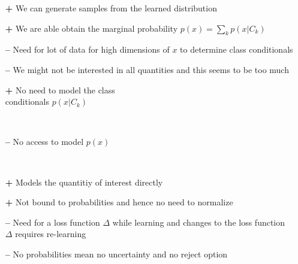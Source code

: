\begin{minipage}{1\textwidth}
	\begin{minipage}[t]{.32\textwidth}
		\vspace*{5pt}
%
		\begin{itemize}
			\item[\color{Green}\textbf{+}] We can generate samples from the learned distribution
			\item[\color{Green}\textbf{+}] We are able obtain the marginal probability $p(x) = \sum_k p(x|C_k)$
			\item[\color{Red}\textbf{--}] Need for lot of data for high dimensions of $x$ to determine class conditionals
			\item[\color{Red}\textbf{--}] We might not be interested in all quantities and this seems to be too much
		\end{itemize}
		\vspace*{5pt}
%
	\end{minipage}
	\hfill\vrule\hfill
	\begin{minipage}[t]{.32\textwidth}
		\vspace*{5pt}
		\begin{itemize}
			\item[\color{Green}\textbf{+}] No need to model the class\\conditionals $p(x|C_k)$
			\item[]~\\
			\item[\color{Red}\textbf{--}] No access to model $p(x)$
			\item[]~\\
		\end{itemize}
		\vspace*{5pt}
	\end{minipage}
	\hfill\vrule\hfill
	\begin{minipage}[t]{.32\textwidth}
		\vspace*{5pt}
		\begin{itemize}
			\item[\color{Green}\textbf{+}] Models the quantitiy of interest directly
			\item[\color{Green}\textbf{+}] Not bound to probabilities and hence no need to normalize
			\item[\color{Red}\textbf{--}] Need for a loss function $\Delta$ while learning and changes to the loss function $\Delta$ requires re-learning
			\item[\color{Red}\textbf{--}] No probabilities mean no uncertainty and no reject option
		\end{itemize}
		\vspace*{5pt}
	\end{minipage}
\end{minipage}
%
%
%
